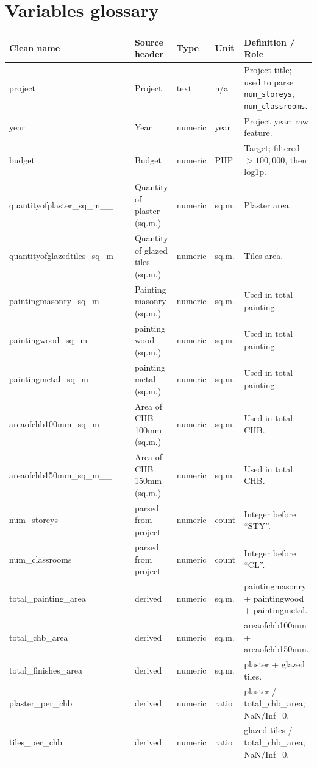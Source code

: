 \documentclass[11pt]{article}
\begin{document}
\section*{Variables glossary}
\small
\noindent\begin{tabularx}{\textwidth}{@{} l l l l X @{}}
\toprule
Clean name & Source header & Type & Unit & Definition / Role \\
\midrule
project & Project & text & n/a & Project title; used to parse \texttt{num\_storeys}, \texttt{num\_classrooms}. \\
year & Year & numeric & year & Project year; raw feature. \\
budget & Budget & numeric & PHP & Target; filtered $>100{,}000$, then log1p. \\
quantityofplaster\_sq\_m\_\_ & Quantity of plaster (sq.m.) & numeric & sq.m. & Plaster area. \\
quantityofglazedtiles\_sq\_m\_\_ & Quantity of glazed tiles (sq.m.) & numeric & sq.m. & Tiles area. \\
paintingmasonry\_sq\_m\_\_ & Painting masonry (sq.m.) & numeric & sq.m. & Used in total painting. \\
paintingwood\_sq\_m\_\_ & painting wood (sq.m.) & numeric & sq.m. & Used in total painting. \\
paintingmetal\_sq\_m\_\_ & painting metal (sq.m.) & numeric & sq.m. & Used in total painting. \\
areaofchb100mm\_sq\_m\_\_ & Area of CHB 100mm (sq.m.) & numeric & sq.m. & Used in total CHB. \\
areaofchb150mm\_sq\_m\_\_ & Area of CHB 150mm (sq.m.) & numeric & sq.m. & Used in total CHB. \\
num\_storeys & parsed from project & numeric & count & Integer before ``STY''. \\
num\_classrooms & parsed from project & numeric & count & Integer before ``CL''. \\
total\_painting\_area & derived & numeric & sq.m. & paintingmasonry + paintingwood + paintingmetal. \\
total\_chb\_area & derived & numeric & sq.m. & areaofchb100mm + areaofchb150mm. \\
total\_finishes\_area & derived & numeric & sq.m. & plaster + glazed tiles. \\
plaster\_per\_chb & derived & numeric & ratio & plaster / total\_chb\_area; NaN/Inf=0. \\
tiles\_per\_chb & derived & numeric & ratio & glazed tiles / total\_chb\_area; NaN/Inf=0. \\
\bottomrule
\end{tabularx}
\normalsize
\end{document}
